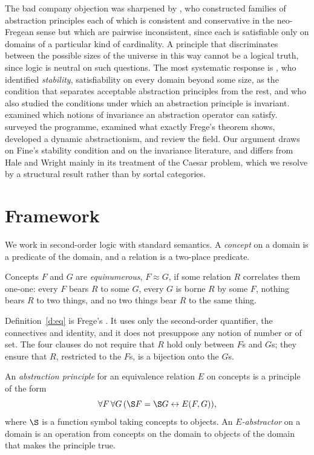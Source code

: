 \documentclass{situationist-preprint}
\begin{document}
The bad company objection was sharpened by \citet{Weir2003}, who constructed families of abstraction principles each of which is consistent and conservative in the neo-Fregean sense but which are pairwise inconsistent, since each is satisfiable only on domains of a particular kind of cardinality. A principle that discriminates between the possible sizes of the universe in this way cannot be a logical truth, since logic is neutral on such questions. The most systematic response is \citet{Fine2002}, who identified \emph{stability}, satisfiability on every domain beyond some size, as the condition that separates acceptable abstraction principles from the rest, and who also studied the conditions under which an abstraction principle is invariant. \citet{Antonelli2010} examined which notions of invariance an abstraction operator can satisfy. \citet{MacBride2003} surveyed the programme, \citet{Heck2011} examined what exactly Frege's theorem shows, \citet{Linnebo2018} developed a dynamic abstractionism, and \citet{EbertRossberg2016} review the field. Our argument draws on Fine's stability condition and on the invariance literature, and differs from Hale and Wright mainly in its treatment of the Caesar problem, which we resolve by a structural result rather than by sortal categories.

\section{Framework}\label{s:framework}

We work in second-order logic with standard semantics. A \emph{concept} on a domain is a predicate of the domain, and a relation is a two-place predicate.

\begin{definition}[Equinumerosity]\label{d:eq}
Concepts $F$ and $G$ are \emph{equinumerous}, $F \approx G$, if some relation $R$ correlates them one-one: every $F$ bears $R$ to some $G$, every $G$ is borne $R$ by some $F$, nothing bears $R$ to two things, and no two things bear $R$ to the same thing.
\end{definition}

Definition~\ref{d:eq} is Frege's \citep[§§71--72]{Frege1884}. It uses only the second-order quantifier, the connectives and identity, and it does not presuppose any notion of number or of set. The four clauses do not require that $R$ hold only between $F$s and $G$s; they ensure that $R$, restricted to the $F$s, is a bijection onto the $G$s.

\begin{definition}[Abstraction]\label{d:abs}
An \emph{abstraction principle} for an equivalence relation $E$ on concepts is a principle of the form
\[ \forall F\, \forall G\, (\S F = \S G \leftrightarrow E(F, G)), \]
where $\S$ is a function symbol taking concepts to objects. An \emph{$E$-abstractor} on a domain is an operation from concepts on the domain to objects of the domain that makes the principle true.
\end{definition}
\end{document}
